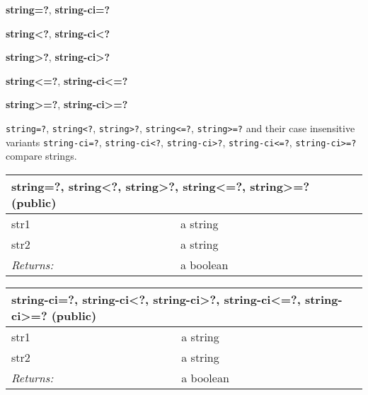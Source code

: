 \documentclass{report}
\begin{document}
\textbf{string=?}, \textbf{string-ci=?}


\textbf{string<?}, \textbf{string-ci<?}


\textbf{string>?}, \textbf{string-ci>?}


\textbf{string<=?}, \textbf{string-ci<=?}


\textbf{string>=?}, \textbf{string-ci>=?}


\texttt{string=?}, \texttt{string<?}, \texttt{string>?}, \texttt{string<=?}, \texttt{string>=?} and their case insensitive variants \texttt{string-ci=?}, \texttt{string-ci<?}, \texttt{string-ci>?}, \texttt{string-ci<=?}, \texttt{string-ci>=?} compare strings.

\begin{tabular}{ |l l| }
\hline
\multicolumn{2}{|l|}{string=?, string<?, string>?, string<=?, string>=? (public)} \\
\hline
str1 & a string \\
str2 & a string \\
\textit{Returns:} & a boolean \\
\hline
\end{tabular}

\begin{tabular}{ |l l| }
\hline
\multicolumn{2}{|l|}{string-ci=?, string-ci<?, string-ci>?, string-ci<=?, string-ci>=? (public)} \\
\hline
str1 & a string \\
str2 & a string \\
\textit{Returns:} & a boolean \\
\hline
\end{tabular}
\end{document}
